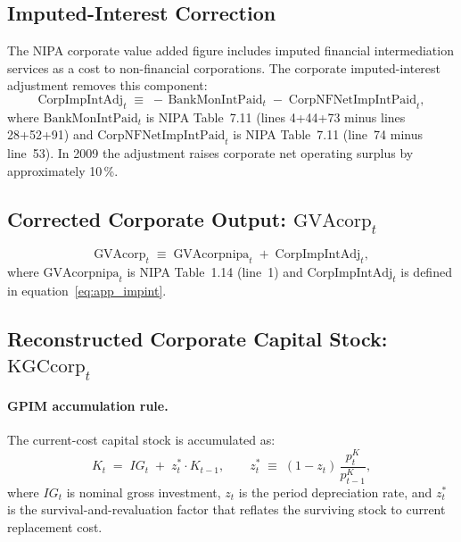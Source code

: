 \documentclass[11pt,a4paper]{article}
\begin{document}
\subsection{Imputed-Interest Correction}

The NIPA corporate value added figure includes imputed financial
intermediation services as a cost to non-financial corporations. The
corporate imputed-interest adjustment removes this component:
%
\begin{equation}
	\label{eq:app_impint}
	\text{CorpImpIntAdj}_t
	\;\equiv\;
	-\,\text{BankMonIntPaid}_t
	\;-\; \text{CorpNFNetImpIntPaid}_t,
\end{equation}
%
where $\text{BankMonIntPaid}_t$ is NIPA Table~7.11
(lines 4+44+73 minus lines 28+52+91) and
$\text{CorpNFNetImpIntPaid}_t$ is NIPA Table~7.11 (line~74 minus line~53).
In 2009 the adjustment raises corporate net operating surplus by
approximately 10\,\%.


\subsection{Corrected Corporate Output: \texorpdfstring{$\text{GVAcorp}_t$}{GVAcorp}}

\begin{equation}
	\label{eq:app_gva}
	\text{GVAcorp}_t
	\;\equiv\;
	\text{GVAcorpnipa}_t \;+\; \text{CorpImpIntAdj}_t,
\end{equation}
%
where $\text{GVAcorpnipa}_t$ is NIPA Table~1.14 (line~1) and
$\text{CorpImpIntAdj}_t$ is defined in equation~\eqref{eq:app_impint}.


\subsection{Reconstructed Corporate Capital Stock: \texorpdfstring{$\text{KGCcorp}_t$}{KGCcorp}}

\paragraph{GPIM accumulation rule.}
The current-cost capital stock is accumulated as:
%
\begin{equation}
	\label{eq:app_gpim}
	K_t \;=\; IG_t \;+\; z_t^* \cdot K_{t-1},
	\qquad
	z_t^* \;\equiv\; (1 - z_t)\,\frac{p^K_t}{p^K_{t-1}},
\end{equation}
%
where $IG_t$ is nominal gross investment, $z_t$ is the period depreciation
rate, and $z_t^*$ is the survival-and-revaluation factor that reflates the
surviving stock to current replacement cost.
\end{document}
